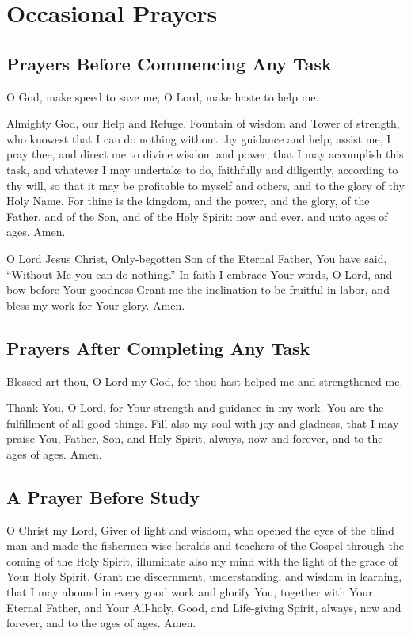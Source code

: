 \section{Occasional Prayers}

\subsection{Prayers Before Commencing Any Task}

O God, make speed to save me; O Lord, make haste to help me.

Almighty God, our Help and Refuge, Fountain of wisdom and Tower of strength, who knowest that I can do nothing without thy guidance and help; assist me, I pray thee, and direct me to divine wisdom and power, that I may accomplish this task, and whatever I may undertake to do, faithfully and diligently, according to thy will, so that it may be profitable to myself and others, and to the glory of thy Holy Name. For thine is the kingdom, and the power, and the glory, of the Father, and of the Son, and of the Holy Spirit: now and ever, and unto ages of ages. Amen.

O Lord Jesus Christ, Only-begotten Son of the Eternal Father, You have said, “Without Me you can do nothing.” In faith I embrace Your words, O Lord, and bow before Your goodness.Grant me the inclination to be fruitful in labor, and bless my work for Your glory. Amen.

\subsection{Prayers After Completing Any Task}

Blessed art thou, O Lord my God, for thou hast helped me and strengthened me.

Thank You, O Lord, for Your strength and guidance in my work. You are the fulfillment of all good things. Fill also my soul with joy and gladness, that I may praise You, Father, Son, and Holy Spirit, always, now and forever, and to the ages of ages. Amen.

\subsection{A Prayer Before Study}

O Christ my Lord, Giver of light and wisdom, who opened the eyes of the blind man and made the fishermen wise heralds and teachers of the Gospel through the coming of the Holy Spirit, illuminate also my mind with the light of the grace of Your Holy Spirit. Grant me discernment, understanding, and wisdom in learning, that I may abound in every good work and glorify You, together with Your Eternal Father, and Your All-holy, Good, and Life-giving Spirit, always, now and forever, and to the ages of ages. Amen.

